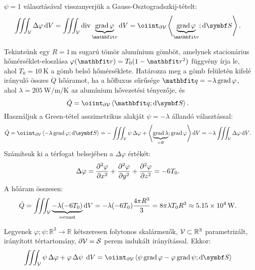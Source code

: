 \documentclass{szb-practice}
\begin{document}
\begin{note}
  $\psi = 1$ választásával visszanyerjük a Gauss-Osztogradszkij-tételt:
  $$
    \iiint_{\volimage} \Delta \varphi \dd \volscalar
    = \iiint_{\volimage} \Div \underbrace{\grad \varphi}_{\rvec v} \dd \volscalar
    = \oiint_{\partial \volimage} \scalar{\underbrace{\grad \varphi}_{\rvec v}}{\dd \surfvec}
    \text.
  $$
\end{note}

\begin{example}
  Tekintsünk egy $R = 1\,\text{m}$ sugarú tömör alumínium gömböt, amelynek
  stacionárius hőmér\-sék\-let-eloszlása $\varphi(\coordv) = T_0 (1 - \rvec r^2)$
  függvény írja le, ahol $T_0 = \SI{10}{\kelvin}$ a gömb belső hőmérséklete.
  Határozza meg a gömb felületén kifelé irányuló összes  $\dot Q$ hőáramot,
  ha a hőfluxus sűrűsége $\rvec q = -\lambda \grad \varphi$, ahol
  $\lambda = \SI[per-mode=symbol]{205}{\watt\per\meter\per\kelvin}$ az
  alumínium hővezetési tényezője, és
  $$
    \dot Q = \oiint_{\partial \volimage} \scalar{\rvec q}{\dd \surfvec}
    \text.
  $$
  Használjuk a Green-tétel asszimetrikus alakját $\psi = -\lambda$ állandó
  választással:
  $$
    \dot Q
    = \oiint_{\partial \volimage} \scalar{-\lambda \grad \varphi}{\dd \surfvec}
    = - \iiint_{\volimage} \psi \, \Delta \varphi + \scalar{\underbrace{\grad \lambda}_{= \nvec}}{\grad \varphi} \dd \volscalar
    = -\lambda \iiint_{\volimage} \Delta \varphi \dd \volscalar
    \text.
  $$
  Számítsuk ki a térfogat belsejében a $\Delta \varphi$ értékét:
  $$
    \Delta \varphi
    =\pdv[order=2]{\varphi}{x} + \pdv[order=2]{\varphi}{y} + \pdv[order=2]{\varphi}{z}
    = -6 T_0
    \text.
  $$
  A hőáram összesen:
  $$
    \dot Q = \iiint_{\mathcal{V}} \underbrace{-\lambda (-6 T_0)}_{=\text{const}} \mathop{}\!\mathrm{d} V
    = -\lambda (-6 T_0) \frac{4\pi R^3}{3}
    = 8 \pi \lambda T_0 R^3
    \approx \SI{5,15e4}{\watt}
    \text.
  $$
\end{example}

\begin{theorem}
  Legyenek $\varphi; \psi: \mathbb R^3 \rightarrow \mathbb R$ kétszeresen
  folytonos skalármezők, $\mathcal{V} \subset \mathbb R^3$ parametrizált,
  irányított tértartomány, $\partial \mathcal{V} = \mathcal{S}$ perem indukált
  irányítással. Ekkor:
  $$
    \iiint_{\volimage}
    \psi \, \Delta \varphi + \varphi \, \Delta \psi
    \; \dd \volscalar
    =
    \oiint_{\partial \volimage}
    \scalar{\psi \grad \varphi - \varphi \grad \psi}{\dd \surfvec}
  $$
\end{theorem}
\end{document}
